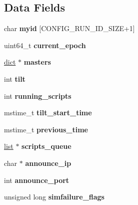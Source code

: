 \subsection*{Data Fields}
\begin{DoxyCompactItemize}
\item 
\mbox{\label{structsentinelState_ad862cfc4b57ae5278c5e5f5109fd19d2}} 
char {\bfseries myid} \mbox{[}C\+O\+N\+F\+I\+G\+\_\+\+R\+U\+N\+\_\+\+I\+D\+\_\+\+S\+I\+ZE+1\mbox{]}
\item 
\mbox{\label{structsentinelState_a4a0c5529c941f5b2f9908a6dd8a321bd}} 
uint64\+\_\+t {\bfseries current\+\_\+epoch}
\item 
\mbox{\label{structsentinelState_afa6f3bd36b144f6f7e4a68c659861951}} 
\hyperlink{structdict}{dict} $\ast$ {\bfseries masters}
\item 
\mbox{\label{structsentinelState_a82c2724c6f1bb19de40976ed767cb990}} 
int {\bfseries tilt}
\item 
\mbox{\label{structsentinelState_ac3959f1a875e4e4fa6d44b379763e2e4}} 
int {\bfseries running\+\_\+scripts}
\item 
\mbox{\label{structsentinelState_a1d8e73afcd015e9f7a51552886b34787}} 
mstime\+\_\+t {\bfseries tilt\+\_\+start\+\_\+time}
\item 
\mbox{\label{structsentinelState_a18b5a3e9feb6876394426d9f4e743373}} 
mstime\+\_\+t {\bfseries previous\+\_\+time}
\item 
\mbox{\label{structsentinelState_a9bb41e12b2073ac814c66f63c7dd987b}} 
\hyperlink{structlist}{list} $\ast$ {\bfseries scripts\+\_\+queue}
\item 
\mbox{\label{structsentinelState_ab20d4a190b32245c86cced580ff5b54f}} 
char $\ast$ {\bfseries announce\+\_\+ip}
\item 
\mbox{\label{structsentinelState_a0d18a9c093c809e1f429a52078913304}} 
int {\bfseries announce\+\_\+port}
\item 
\mbox{\label{structsentinelState_af8b2029cdb867c8598ef73ebde002b62}} 
unsigned long {\bfseries simfailure\+\_\+flags}
\end{DoxyCompactItemize}


